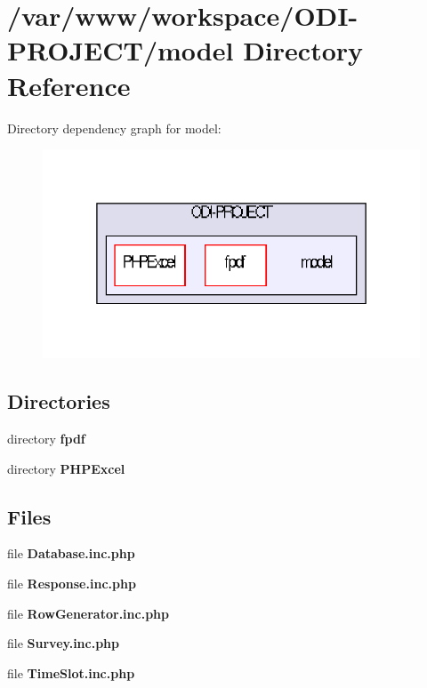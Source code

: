 \section{/var/www/workspace/\+O\+D\+I-\/\+P\+R\+O\+J\+E\+C\+T/model Directory Reference}
\label{dir_c1c3e9d80964174e5019e4a5a6db4916}
Directory dependency graph for model\+:\nopagebreak
\begin{figure}[H]
\begin{center}
\leavevmode
\includegraphics[width=334pt]{dir_c1c3e9d80964174e5019e4a5a6db4916_dep}
\end{center}
\end{figure}
\subsection*{Directories}
\begin{DoxyCompactItemize}
\item 
directory {\bf fpdf}
\item 
directory {\bf P\+H\+P\+Excel}
\end{DoxyCompactItemize}
\subsection*{Files}
\begin{DoxyCompactItemize}
\item 
file {\bfseries Database.\+inc.\+php}
\item 
file {\bfseries Response.\+inc.\+php}
\item 
file {\bfseries Row\+Generator.\+inc.\+php}
\item 
file {\bfseries Survey.\+inc.\+php}
\item 
file {\bfseries Time\+Slot.\+inc.\+php}
\end{DoxyCompactItemize}
